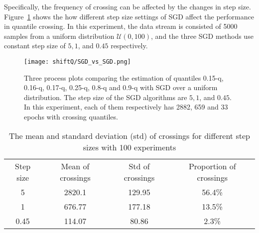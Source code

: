 Specifically, the frequency of crossing can be affected by the changes in step size. Figure~\ref{fig: SGD_SGD} shows the how different step size settings of SGD affect the performance in quantile crossing. In this experiment, the data stream is consisted of 5000 samples from a uniform distribution $\mathcal{U}(0,100)$, and the three SGD methods use constant step size of $5, 1$, and $0.45$ respectively. 
    \begin{figure}[h!]
        \texttt{[image: shiftQ/SGD\_vs\_SGD.png]}
        \caption{Three process plots comparing the estimation of quantiles 0.15-q, 0.16-q, 0.17-q, 0.25-q, 0.8-q and 0.9-q with SGD over a uniform distribution. The step size of the SGD algorithms are $5, 1$, and $0.45$. In this experiment, each of them respectively has 2882, 659 and 33 epochs with crossing quantiles.}
        \label{fig: SGD_SGD}
    \end{figure}

    \begin{table}[h!]
        \centering
        \caption{The mean and standard deviation (std) of crossings for different step sizes with 100 experiments}
        \begin{tabular}{cccc}
        \toprule
        Step size & Mean of crossings   & Std of crossings              & Proportion of crossings\\ 
        5         & 2820.1              & 129.95                        & 56.4\%                 \\
        1         & 676.77              & 177.18                        & 13.5\%                 \\
        0.45      & 114.07              & 80.86                         & 2.3\%      \\
        \bottomrule
        \end{tabular}
        \label{tab: SGD_SGD}
    \end{table}

